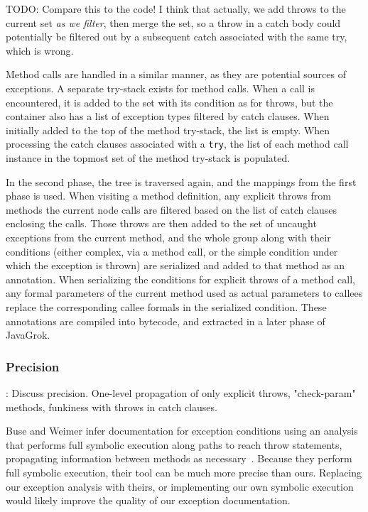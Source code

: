 {\LARGE TODO: Compare this to the code! I think that actually, we add throws to
the current set \emph{as we filter}, then merge the set, so a throw in a catch
body could potentially be filtered out by a subsequent catch associated with the
same try, which is wrong.}

Method calls are handled in a similar manner, as they are potential sources of
exceptions.  A separate try-stack exists for method calls.  When a call is
encountered, it is added to the set with its condition as for throws, but the
container also has a list of exception types filtered by catch clauses.  When
initially added to the top of the method try-stack, the list is empty.  When
processing the catch clauses associated with a \texttt{try}, the list of each
method call instance in the topmost set of the method try-stack is populated. 

In the second phase, the tree is traversed again, and the mappings from the first
phase is used.  When visiting a method definition, any explicit throws from
methods the current node calls are filtered based on the list of catch clauses
enclosing the calls.  Those throws are then added to the set of uncaught
exceptions from the current method, and the whole group along with their
conditions (either complex, via a method call, or the simple condition under
which the exception is thrown) are serialized and added to that method as an
annotation.  When serializing the conditions for explicit throws of a method
call, any formal parameters of the current method used as actual parameters to
callees replace the corresponding callee formals in the serialized condition.
These annotations are compiled into bytecode, and extracted in a later phase of
JavaGrok.

\subsubsection{Precision}
{\LARGE: Discuss precision.  One-level propagation of only explicit throws,
"check-param" methods, funkiness with throws in catch clauses.}

Buse and Weimer infer documentation for exception conditions
using an analysis that performs full symbolic execution along paths to reach throw
statements, propagating information between methods as necessary~\cite{autodoc}.
Because they
perform full symbolic execution, their tool can be much more precise than ours.
Replacing our exception analysis with theirs, or implementing our own symbolic
execution would likely improve the quality of our exception documentation.  

